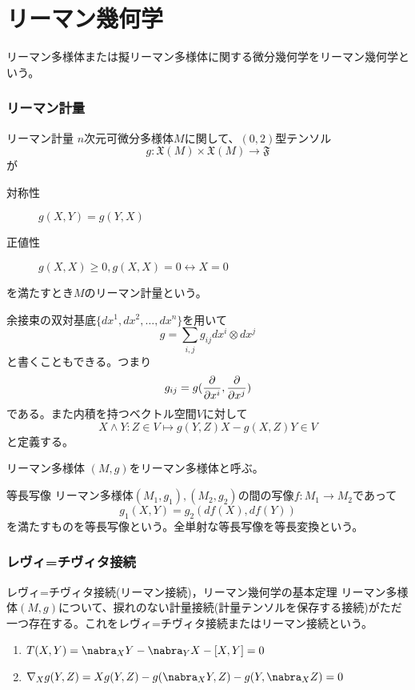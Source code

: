 \part{リーマン幾何学}

リーマン多様体または擬リーマン多様体に関する微分幾何学をリーマン幾何学という。

\section{リーマン計量}
    \begin{dfn}{リーマン計量}
        $n$次元可微分多様体$M$に関して、$(0, 2)$型テンソル
            \[g: \mathfrak{X}(M) \times \mathfrak{X}(M) \rightarrow \mathfrak{F}\]
        が
        \begin{description}
            \item[対称性] $g(X, Y) = g(Y, X)$
            \item[正値性] $g(X, X) \geq 0, g(X, X) = 0 \leftrightarrow X = 0$
        \end{description}
        を満たすとき$M$のリーマン計量という。
    \end{dfn}
    余接束の双対基底$\{dx^1, dx^2, \dots, dx^n\}$を用いて
        \[g = \sum_{i,j} g_{ij}dx^i \otimes dx^j\]
    と書くこともできる。つまり
        \[g_{ij} = g(\frac{\partial }{\partial x^i}, \frac{\partial }{\partial x^j})\]
    である。また内積を持つベクトル空間$V$に対して
        \[X \wedge Y: Z \in V \mapsto g(Y, Z)X - g(X, Z)Y \in V\]
    と定義する。
    \begin{dfn}{リーマン多様体}
        $(M, g)$をリーマン多様体と呼ぶ。
    \end{dfn}

    \begin{dfn}{等長写像}
        リーマン多様体$(M_1, g_1), (M_2, g_2)$の間の写像$f: M_1 \rightarrow M_2$であって
            \[g_1(X, Y) = g_2(df(X), df(Y))\]
        を満たすものを等長写像という。全単射な等長写像を等長変換という。
    \end{dfn}

\section{レヴィ=チヴィタ接続}
    \begin{dfn}{レヴィ=チヴィタ接続(リーマン接続)，リーマン幾何学の基本定理}
        リーマン多様体$(M, g)$について、捩れのない計量接続(計量テンソルを保存する接続)がただ一つ存在する。これをレヴィ=チヴィタ接続またはリーマン接続という。
        \begin{enumerate}
            \item $T(X, Y) = \nabra_XY - \nabra_YX - [X, Y] = 0$
            \item $\nabla_Xg(Y, Z) = Xg(Y, Z) - g(\nabra_XY, Z) - g(Y, \nabra_XZ) = 0$
        \end{enumerate}
    \end{dfn}

